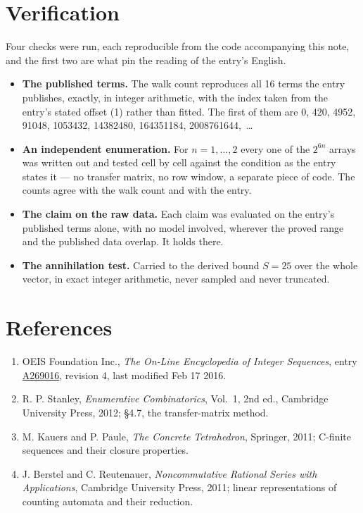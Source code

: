 \documentclass[11pt]{article}
\theoremstyle{definition}
\begin{document}
\section{Verification}

Four checks were run, each reproducible from the code accompanying this note, and the first two are what pin the reading of the entry's English.

\begin{itemize}

\item {\bfseries The published terms.} The walk count reproduces all 16 terms the entry publishes, exactly, in integer arithmetic, with the index taken from the entry's stated offset (1) rather than fitted. The first of them are 0, 420, 4952, 91048, 1053432, 14382480, 164351184, 2008761644,~\dots

\item {\bfseries An independent enumeration.} For $n = 1,\dots,2$ every one of the $2^{6n}$ arrays was written out and tested cell by cell against the condition as the entry states it --- no transfer matrix, no row window, a separate piece of code. The counts agree with the walk count and with the entry.

\item {\bfseries The claim on the raw data.} Each claim was evaluated on the entry's published terms alone, with no model involved, wherever the proved range and the published data overlap. It holds there.

\item {\bfseries The annihilation test.} Carried to the derived bound $S = 25$ over the whole vector, in exact integer arithmetic, never sampled and never truncated.

\end{itemize}

\section{References}

\begin{enumerate}

\item OEIS Foundation Inc., \emph{The On-Line Encyclopedia of Integer Sequences}, entry \href{https://oeis.org/A269016}{A269016}, revision 4, last modified Feb 17 2016.

\item R. P. Stanley, \emph{Enumerative Combinatorics}, Vol.~1, 2nd ed., Cambridge University Press, 2012; \S4.7, the transfer-matrix method.

\item M. Kauers and P. Paule, \emph{The Concrete Tetrahedron}, Springer, 2011; C-finite sequences and their closure properties.

\item J. Berstel and C. Reutenauer, \emph{Noncommutative Rational Series with Applications}, Cambridge University Press, 2011; linear representations of counting automata and their reduction.

\end{enumerate}
\end{document}
